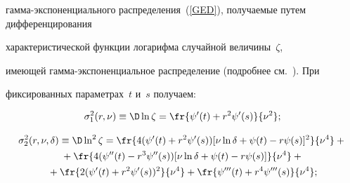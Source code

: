 гам\-ма-экс\-по\-нен\-ци\-аль\-но\-го распределения~(\ref{GED}), получаемые путем дифференцирования 


характеристической функции логарифма случайной величины~$\zeta$, 


име\-ющей гам\-ма-экс\-по\-нен\-ци\-аль\-ное распределение (подробнее см.~\cite{KuShe2020,KuShe2021}). При 


фиксированных па\-ра\-мет\-рах~$t$ и~$s$ получаем:


\begin{equation*}




\sigma_1^2(r,\nu)\equiv\D\ln \zeta=


\fr{\psi'(t)+r^2\psi'(s)}{\nu^2};


\end{equation*}





\vspace*{-12pt}





\noindent


\begin{multline}


\sigma_2^2(r,\nu,\delta)\equiv \D \ln^2 \zeta=


\fr{4(\psi'(t)+r^2\psi'(s))[\nu\ln\delta+\psi(t)-r\psi(s)]^2}{\nu^4}+{}


\\


{}+\fr{4(\psi''(t)-r^3\psi''(s))[\nu\ln\delta+\psi(t)-r\psi(s)]}{\nu^4}+{}


\\


{}+\fr{2(\psi'(t)+r^2\psi'(s))^2}{\nu^4}+\fr{\psi'''(t)+r^4\psi'''(s)}{\nu^4};


\label{D_ln_2}


\end{multline}





\vspace*{-12pt}





\noindent



